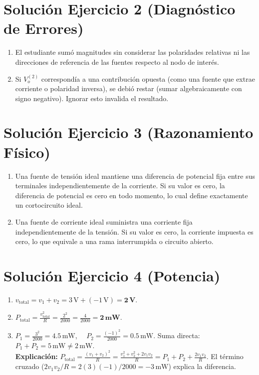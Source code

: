 \documentclass[11pt, a4paper]{article}
\begin{document}
\section*{Solución Ejercicio 2 (Diagnóstico de Errores)}
\begin{enumerate}
    \item El estudiante sumó magnitudes sin considerar las polaridades relativas ni las direcciones de referencia de las fuentes respecto al nodo de interés.
    \item Si $V_o^{(2)}$ correspondía a una contribución opuesta (como una fuente que extrae corriente o polaridad inversa), se debió restar (sumar algebraicamente con signo negativo). Ignorar esto invalida el resultado.
\end{enumerate}

\section*{Solución Ejercicio 3 (Razonamiento Físico)}
\begin{enumerate}
    \item Una fuente de tensión ideal mantiene una diferencia de potencial fija entre sus terminales independientemente de la corriente. Si su valor es cero, la diferencia de potencial es cero en todo momento, lo cual define exactamente un cortocircuito ideal.
    \item Una fuente de corriente ideal suministra una corriente fija independientemente de la tensión. Si su valor es cero, la corriente impuesta es cero, lo que equivale a una rama interrumpida o circuito abierto.
\end{enumerate}

\section*{Solución Ejercicio 4 (Potencia)}
\begin{enumerate}
    \item $v_{\text{total}} = v_1 + v_2 = 3\,\text{V} + (-1\,\text{V}) = \mathbf{2\,\text{V}}$.
    \item $P_{\text{total}} = \frac{v_{\text{total}}^2}{R} = \frac{2^2}{2000} = \frac{4}{2000} = \mathbf{2\,\text{mW}}$.
    \item $P_1 = \frac{3^2}{2000} = 4.5\,\text{mW}$, $\quad P_2 = \frac{(-1)^2}{2000} = 0.5\,\text{mW}$.
    \quad Suma directa: $P_1 + P_2 = 5\,\text{mW} \neq 2\,\text{mW}$. \\
    \textbf{Explicación:} $P_{\text{total}} = \frac{(v_1+v_2)^2}{R} = \frac{v_1^2 + v_2^2 + 2v_1v_2}{R} = P_1 + P_2 + \frac{2v_1v_2}{R}$. El término cruzado ($2v_1v_2/R = 2(3)(-1)/2000 = -3\,\text{mW}$) explica la diferencia.
\end{enumerate}
\end{document}
